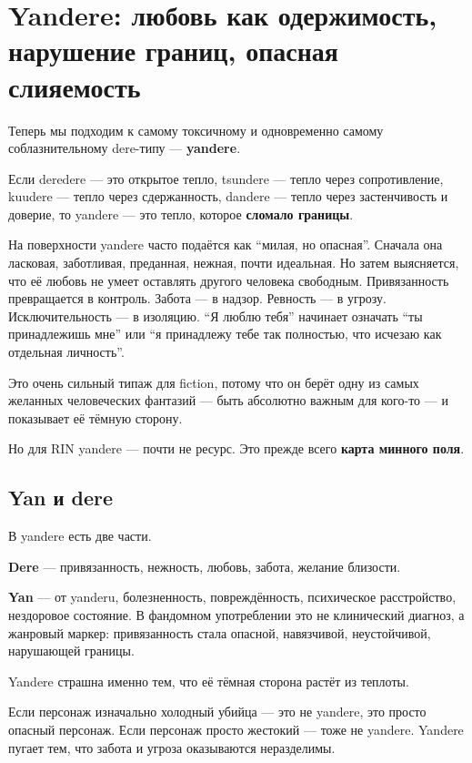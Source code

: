 \section{Yandere: любовь как одержимость, нарушение границ, опасная слияемость}

Теперь мы подходим к самому токсичному и одновременно самому
соблазнительному dere-типу --- \textbf{yandere}.

Если deredere --- это открытое тепло, tsundere --- тепло через
сопротивление, kuudere --- тепло через сдержанность, dandere --- тепло
через застенчивость и доверие, то yandere --- это тепло, которое
\textbf{сломало границы}.

На поверхности yandere часто подаётся как ``милая, но опасная''. Сначала
она ласковая, заботливая, преданная, нежная, почти идеальная. Но затем
выясняется, что её любовь не умеет оставлять другого человека свободным.
Привязанность превращается в контроль. Забота --- в надзор. Ревность ---
в угрозу. Исключительность --- в изоляцию. ``Я люблю тебя'' начинает
означать ``ты принадлежишь мне'' или ``я принадлежу тебе так полностью,
что исчезаю как отдельная личность''.

Это очень сильный типаж для fiction, потому что он берёт одну из самых
желанных человеческих фантазий --- быть абсолютно важным для кого-то ---
и показывает её тёмную сторону.

Но для RIN yandere --- почти не ресурс. Это прежде всего \textbf{карта
минного поля}.

\subsection*{Yan и dere}

В yandere есть две части.

\textbf{Dere} --- привязанность, нежность, любовь, забота, желание
близости.

\textbf{Yan} --- от yanderu, болезненность, повреждённость, психическое
расстройство, нездоровое состояние. В фандомном употреблении это не
клинический диагноз, а жанровый маркер: привязанность стала опасной,
навязчивой, неустойчивой, нарушающей границы.

Yandere страшна именно тем, что её тёмная сторона растёт из теплоты.

Если персонаж изначально холодный убийца --- это не yandere, это просто
опасный персонаж. Если персонаж просто жестокий --- тоже не yandere.
Yandere пугает тем, что забота и угроза оказываются неразделимы.

